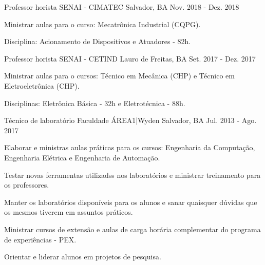 

\begin{cventries}

  \cventry
    {Professor horista} %
    {SENAI - CIMATEC} %
    {Salvador, BA} %
    {Nov. 2018 - Dez. 2018} %
    {
      \begin{cvitems} %
        \item {Ministrar aulas para o curso: Mecatrônica Industrial (CQPG).}
        \item {Disciplina: Acionamento de Dispositivos e Atuadores - 82h.}
      \end{cvitems}
    }

  \cventry
    {Professor horista} %
    {SENAI - CETIND} %
    {Lauro de Freitas, BA} %
    {Set. 2017 - Dez. 2017} %
    {
      \begin{cvitems} %
        \item {Ministrar aulas para o cursos: Técnico em Mecânica (CHP) e Técnico em Eletroeletrônica (CHP).}
        \item {Disciplinas: Eletrônica Básica - 32h e Eletrotécnica - 88h.}
      \end{cvitems}
    }
    
  \cventry
    {Técnico de laboratório} %
    {Faculdade ÁREA1|Wyden} %
    {Salvador, BA} %
    {Jul. 2013 - Ago. 2017} %
    {
      \begin{cvitems} %
        \item {Elaborar e ministras aulas práticas para os cursos: Engenharia da Computação, Engenharia Elétrica e Engenharia de Automação.}
        \item {Testar novas ferramentas utilizadss nos laboratórios e ministrar treinamento para os professores.}
        \item {Manter os laboratórios disponíveis para os alunos e sanar quaisquer dúvidas que os mesmos tiverem em assuntos práticos.}
        \item { Ministrar cursos de extensão e aulas de carga horária complementar do programa de experiências - PEX.}
        \item {Orientar e liderar alunos em projetos de pesquisa.}
      \end{cvitems}
    }


\end{cventries}

